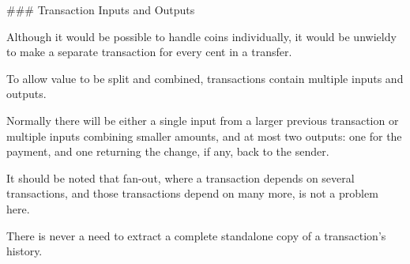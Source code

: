 ### Transaction Inputs and Outputs

Although it would be possible to handle coins individually, it would be unwieldy to make a separate transaction for every cent in a transfer.

To allow value to be split and combined, transactions contain multiple inputs and outputs.

Normally there will be either a single input from a larger previous transaction or multiple inputs combining smaller amounts, and at most two outputs: one for the payment, and one returning the change, if any, back to the sender.

It should be noted that fan-out, where a transaction depends on several transactions, and those transactions depend on many more, is not a problem here.

There is never a need to extract a complete standalone copy of a transaction's history.